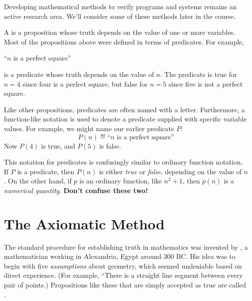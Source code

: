 Developing mathematical methods to verify programs and systems remains an
active research area.  We'll consider some of these methods later in the
course.



A  is a proposition whose truth depends on the value of
one or more variables.  Most of the propositions above were defined in
terms of predicates.  For example,
%
\begin{center}
``$n$ is a perfect square''
\end{center}
%
is a predicate whose truth depends on the value of $n$.  The predicate is
true for $n = 4$ since four is a perfect square, but false for $n = 5$
since five is not a perfect square.  

Like other propositions, predicates are often named with a letter.
Furthermore, a function-like notation is used to denote a predicate
supplied with specific variable values.  For example, we might name
our earlier predicate $P$:
%
\[
P(n) \eqdef \text{``$n$ is a perfect square''}
\]
%
Now $P(4)$ is true, and $P(5)$ is false.

This notation for predicates is confusingly similar to ordinary function
notation.  If $P$ is a predicate, then $P(n)$ is either \textit{true} or
\textit{false}, depending on the value of $n$.  On the other hand, if $p$
is an ordinary function, like $n^2 + 1$, then $p(n)$ is a
\textit{numerical quantity}.  \textbf{Don't confuse these two!}


\section{The Axiomatic Method}

The standard procedure for establishing truth in mathematics was invented
by , a mathematician working in Alexandria, Egypt around 300 BC.
His idea was to begin with five \textit{assumptions} about geometry, which
seemed undeniable based on direct experience.  (For example, ``There is a
straight line segment between every pair of points.)  Propositions like
these that are simply accepted as true are called .

